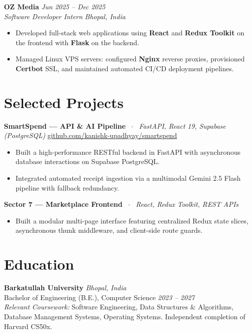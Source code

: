 \documentclass[10pt,a4paper]{article}
\begin{document}
\textbf{OZ Media} \hfill \textit{Jun 2025 -- Dec 2025} \\
\textit{Software Developer Intern} \hfill \textit{Bhopal, India}
\begin{itemize}
    \item Developed full-stack web applications using \textbf{React} and \textbf{Redux Toolkit} on the frontend with \textbf{Flask} on the backend.
    \item Managed Linux VPS servers: configured \textbf{Nginx} reverse proxies, provisioned \textbf{Certbot} SSL, and maintained automated CI/CD deployment pipelines.
\end{itemize}

\section{Selected Projects}
\textbf{SmartSpend — API & AI Pipeline} \ $\cdot$ \ \textit{FastAPI, React 19, Supabase (PostgreSQL)} \hfill \href{https://github.com/kanishk-upadhyay/smartspend}{github.com/kanishk-upadhyay/smartspend}
\begin{itemize}
    \item Built a high-performance RESTful backend in FastAPI with asynchronous database interactions on Supabase PostgreSQL.
    \item Integrated automated receipt ingestion via a multimodal Gemini 2.5 Flash pipeline with fallback redundancy.
\end{itemize}

\textbf{Sector 7 — Marketplace Frontend} \ $\cdot$ \ \textit{React, Redux Toolkit, REST APIs}
\begin{itemize}
    \item Built a modular multi-page interface featuring centralized Redux state slices, asynchronous thunk middleware, and client-side route guards.
\end{itemize}

\section{Education}
\textbf{Barkatullah University} \hfill \textit{Bhopal, India} \\
Bachelor of Engineering (B.E.), Computer Science \hfill \textit{2023 -- 2027} \\
\textit{Relevant Coursework:} Software Engineering, Data Structures \& Algorithms, Database Management Systems, Operating Systems. Independent completion of Harvard CS50x.
\end{document}

